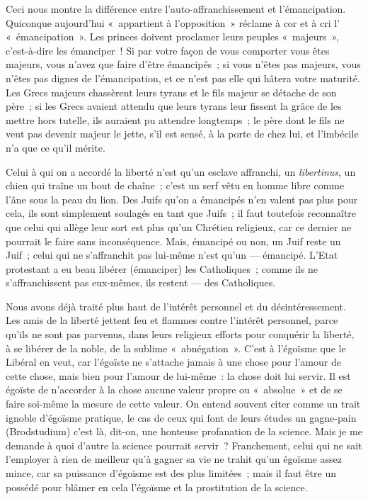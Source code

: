 \documentclass[french,twoside]{book} %
\begin{document}
Ceci nous montre la différence entre l’auto-affranchissement et l’émancipation. Quiconque aujourd’hui « appartient à l’opposition » réclame à cor et à cri l’ « émancipation ». Les princes doivent proclamer leurs peuples « majeurs », c’est-à-dire les émanciper ! Si par votre façon de vous comporter vous êtes majeurs, vous n’avez que faire d’être émancipés ; si vous n’êtes pas majeurs, vous n’êtes pas dignes de l’émancipation, et ce n’est pas elle qui hâtera votre maturité. Les Grecs majeurs chassèrent leurs tyrans et le fils majeur se détache de son père ; si les Grecs avaient attendu que leurs tyrans leur fissent la grâce de les mettre hors tutelle, ils auraient pu attendre longtemps ; le père dont le fils ne veut pas devenir majeur le jette, s’il est sensé, à la porte de chez lui, et l’imbécile n’a que ce qu’il mérite.\par
Celui à qui on a accordé la liberté n’est qu’un esclave affranchi, un \emph{libertinus}, un chien qui traîne un bout de chaîne ; c’est un serf vêtu en homme libre comme l’âne sous la peau du lion. Des Juifs qu’on a émancipés n’en valent pas plus pour cela, ils  sont simplement soulagés en tant que Juifs ; il faut toutefois reconnaître que celui qui allège leur sort est plus qu’un Chrétien religieux, car ce dernier ne pourrait le faire sans inconséquence. Mais, émancipé ou non, un Juif reste un Juif ; celui qui ne s’affranchit pas lui-même n’est qu’un — émancipé. L’Etat protestant a eu beau libérer (émanciper) les Catholiques ; comme ils ne s’affranchissent pas eux-mêmes, ils restent — des Catholiques.\par
Nous avons déjà traité plus haut de l’intérêt personnel et du désintéressement. Les amis de la liberté jettent feu et flammes contre l’intérêt personnel, parce qu’ils ne sont pas parvenus, dans leurs religieux efforts pour conquérir la liberté, à se libérer de la noble, de la sublime « abnégation ». C’est à l’égoïsme que le Libéral en veut, car l’égoïste ne s’attache jamais à une chose pour l’amour de cette chose, mais bien pour l’amour de lui-même : la chose doit lui servir. Il est égoïste de n’accorder à la chose aucune valeur propre ou « absolue » et de se faire soi-même la mesure de cette valeur. On entend souvent citer comme un trait ignoble d’égoïsme pratique, le cas de ceux qui font de leurs études un gagne-pain (Brodstudium) c’est là, dit-on, une honteuse profanation de la science. Mais je me demande à quoi d’autre la science pourrait servir ? Franchement, celui qui ne sait l’employer à rien de meilleur qu’à gagner sa vie ne trahit qu’un égoïsme assez mince, car sa puissance d’égoïsme est des plus limitées ; mais il faut être un possédé pour blâmer en cela l’égoïsme et la prostitution de la science.\par
\end{document}
